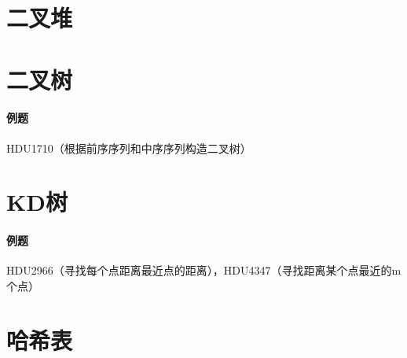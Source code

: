 \section{二叉堆}


\section{二叉树}

\paragraph{例题} HDU1710（根据前序序列和中序序列构造二叉树）



\section{KD树}

\paragraph{例题} HDU2966（寻找每个点距离最近点的距离），HDU4347（寻找距离某个点最近的m个点）



\section{哈希表}

